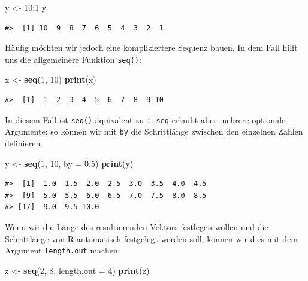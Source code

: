 \documentclass[]{tufte-book}
\newenvironment{Shaded}{}{}
\newcommand{\KeywordTok}[1]{\textcolor[rgb]{0.00,0.44,0.13}{\textbf{#1}}}
\newcommand{\DataTypeTok}[1]{\textcolor[rgb]{0.56,0.13,0.00}{#1}}
\newcommand{\DecValTok}[1]{\textcolor[rgb]{0.25,0.63,0.44}{#1}}
\newcommand{\FloatTok}[1]{\textcolor[rgb]{0.25,0.63,0.44}{#1}}
\newcommand{\StringTok}[1]{\textcolor[rgb]{0.25,0.44,0.63}{#1}}
\newcommand{\OperatorTok}[1]{\textcolor[rgb]{0.40,0.40,0.40}{#1}}
\newcommand{\NormalTok}[1]{#1}
\begin{document}
\begin{Shaded}
\begin{Highlighting}[]
\NormalTok{y <-}\StringTok{ }\DecValTok{10}\OperatorTok{:}\DecValTok{1}
\NormalTok{y}
\end{Highlighting}
\end{Shaded}

\begin{verbatim}
#>  [1] 10  9  8  7  6  5  4  3  2  1
\end{verbatim}

Häufig möchten wir jedoch eine kompliziertere Sequenz bauen. In dem Fall
hilft uns die allgemeinere Funktion \texttt{seq()}:

\begin{Shaded}
\begin{Highlighting}[]
\NormalTok{x <-}\StringTok{ }\KeywordTok{seq}\NormalTok{(}\DecValTok{1}\NormalTok{, }\DecValTok{10}\NormalTok{)}
\KeywordTok{print}\NormalTok{(x)}
\end{Highlighting}
\end{Shaded}

\begin{verbatim}
#>  [1]  1  2  3  4  5  6  7  8  9 10
\end{verbatim}

In diesem Fall ist \texttt{seq()} äquivalent zu \texttt{:}. \texttt{seq}
erlaubt aber mehrere optionale Argumente: so können wir mit \texttt{by}
die Schrittlänge zwischen den einzelnen Zahlen definieren.

\begin{Shaded}
\begin{Highlighting}[]
\NormalTok{y <-}\StringTok{ }\KeywordTok{seq}\NormalTok{(}\DecValTok{1}\NormalTok{, }\DecValTok{10}\NormalTok{, }\DataTypeTok{by =} \FloatTok{0.5}\NormalTok{)}
\KeywordTok{print}\NormalTok{(y)}
\end{Highlighting}
\end{Shaded}

\begin{verbatim}
#>  [1]  1.0  1.5  2.0  2.5  3.0  3.5  4.0  4.5
#>  [9]  5.0  5.5  6.0  6.5  7.0  7.5  8.0  8.5
#> [17]  9.0  9.5 10.0
\end{verbatim}

Wenn wir die Länge des resultierenden Vektors festlegen wollen und die
Schrittlänge von R automatisch festgelegt werden soll, können wir dies
mit dem Argument \texttt{length.out} machen:

\begin{Shaded}
\begin{Highlighting}[]
\NormalTok{z <-}\StringTok{ }\KeywordTok{seq}\NormalTok{(}\DecValTok{2}\NormalTok{, }\DecValTok{8}\NormalTok{, }\DataTypeTok{length.out =} \DecValTok{4}\NormalTok{)}
\KeywordTok{print}\NormalTok{(z)}
\end{Highlighting}
\end{Shaded}
\end{document}
